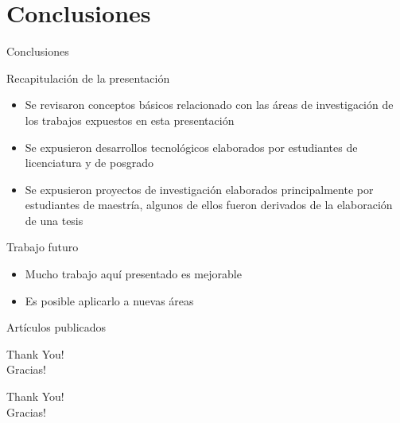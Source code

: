\documentclass[aspectratio=169,compress]{beamer}
\begin{document}
%





\section{Conclusiones}
\begin{frame}{Conclusiones}
\begin{block}{Recapitulación de la presentación} 
	\begin{itemize}
\item Se revisaron conceptos básicos relacionado con las áreas de investigación de los trabajos expuestos en esta presentación
\item Se expusieron desarrollos tecnológicos elaborados por estudiantes de licenciatura y de posgrado
\item Se expusieron proyectos de investigación elaborados principalmente por estudiantes de maestría, algunos de ellos fueron derivados de la elaboración de una tesis
	\end{itemize}
\end{block} 

\begin{block}{Trabajo futuro} 
	\begin{itemize}
        \item Mucho trabajo aquí presentado es mejorable
        \item Es posible aplicarlo a nuevas áreas
	\end{itemize}

\end{block} 

\end{frame}



\renewcommand*{\bibfont}{\tiny}
\begin{frame}[allowframebreaks]{Artículos publicados}
    \printbibliography[title=Artículos publicados,keyword=primary]
\end{frame}

\begin{frame}%
\begin{center}
\Huge Thank You! \\
\Huge Gracias! \\
\end{center}
\end{frame}

\begin{frame}%
\begin{center}
{\fontsize{40}{50}\selectfont Thank You!}\\
{\fontsize{40}{50}\selectfont Gracias!}
\end{center}
\end{frame}
\end{document}
